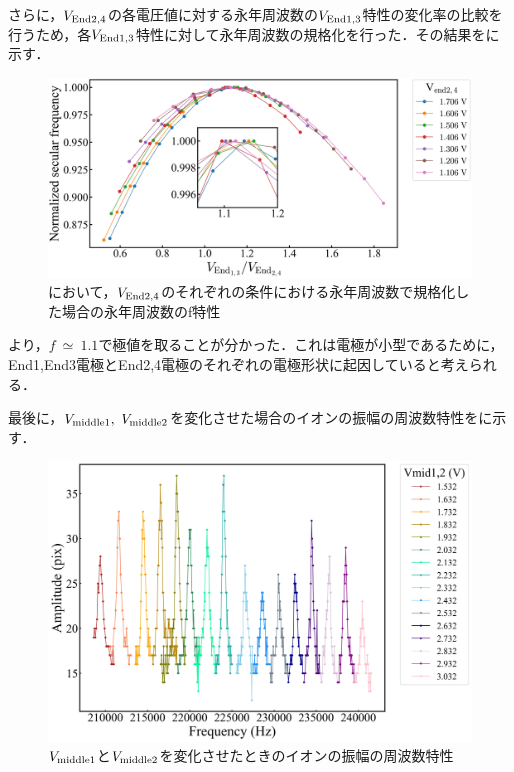 さらに，$V_{\rm End2,4}$の各電圧値に対する永年周波数の$V_{\rm End1,3}$特性の変化率の比較を行うため，各$V_{\rm End1,3}$特性に対して永年周波数の規格化を行った．その結果をに示す．

\begin{figure}[h]
	\begin{center}
		\includegraphics[width = 0.7\linewidth]{./results/figure/Normalized_Vendodd_Vendeven-SecFreqZ_.jpg}
		\caption{において，$V_{\rm End2,4}$のそれぞれの条件における永年周波数で規格化した場合の永年周波数のf特性}
		\label{fig:Norm_Vendodd_Vendeven_f}
	\end{center}
\end{figure}

より，$f \ \simeq \ 1.1$で極値を取ることが分かった．これは電極が小型であるために，End1,End3電極とEnd2,4電極のそれぞれの電極形状に起因していると考えられる．

\clearpage

最後に，$V_{\rm middle1}, \ V_{\rm middle2}$を変化させた場合のイオンの振幅の周波数特性をに示す．

\begin{figure}[h]
	\begin{center}
		\includegraphics[width = 0.6\linewidth]{./results/figure/mid-SecFreq.jpg}
		\caption{$V_{\rm middle1}$と$V_{\rm middle2}$を変化させたときのイオンの振幅の周波数特性}
		\label{fig:mid_MeasSec}
	\end{center}
\end{figure}

